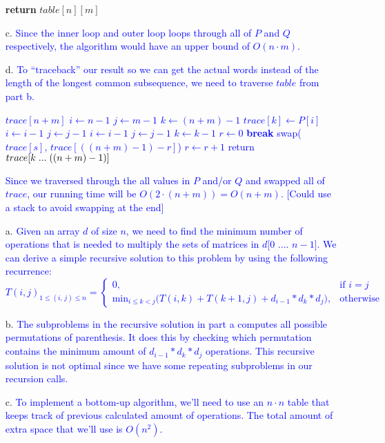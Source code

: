 \documentclass[11pt]{article}
\begin{document}
\begin{itemize}
{\begin{algorithmic}[1]
				\EndIf
			\EndIf
		\EndFor
	\EndFor
	\State \textbf{return} $table[n][m]$
\EndFunction
\end{algorithmic}
}
\item[c.]
\textcolor{blue}{
Since the inner loop and outer loop loops through all of $P$ and $Q$ respectively, the algorithm would have an upper bound of $\boxed{O(n \cdot m)}$.
}
\item[d.]
\textcolor{blue}{
To ``traceback'' our result so we can get the actual words instead of the length of the longest common subsequence, we need to traverse $table$ from part b. 
}
\textcolor{blue}{
\begin{algorithmic}[1]
	\State $trace[n+m]$  
	\State $i \gets n - 1$
	\State $j \gets m - 1$
	\State $k \gets (n+m)-1$
			\State $trace[k] \gets P[i]$
			\State $i \gets i -1$
			\State $j \gets j - 1$
			\State $i \gets i - 1$
		\Else
			\State $j \gets j - 1$
		\EndIf
		\State $k \gets k - 1$
	\EndWhile 
	\State $r \gets 0$
	 
			\State \textbf{break}
		\EndIf
		\State swap($trace[s]$, $trace[((n+m)-1)-r]$)  
		\State $r \gets r + 1$		
	\EndFor
	\State return $trace[k \hspace{1mm} ... \hspace{1mm} ((n+m)-1)]$
\EndFunction
\end{algorithmic}
}

\textcolor{blue}{
Since we traversed through the all values in $P$ and/or $Q$ and swapped all of $trace$, our running time will be $O(2 \cdot (n + m)) = \boxed{O(n + m)}$. [Could use a stack to avoid swapping at the end]
}

\item[a.] 
\textcolor{blue}{
Given an array $d$ of size $n$, we need to find the minimum number of operations that is needed to multiply the sets of matrices in $d[0$ .... $n-1]$. We can derive a simple recursive solution to this problem by using the following recurrence:
$$\boxed{{\displaystyle T(i,j)_{1\leq (i\text{, }j) \leq n}={
\begin{cases}{0},&{\text{if }} i = j\\ \text{min}_{i \leq k < j} \big(T(i, k) + T(k+1, j) + d_{i-1} * d_k * d_j \big),&{\text{otherwise}} 
\end{cases}}}}$$
}
\item[b.]
\textcolor{blue}{
	The subproblems in the recursive solution in part a computes all possible permutations of parenthesis.  It does this by checking which permutation contains the minimum amount of $d_{i-1} * d_k * d_j$ operations. This recursive solution is not optimal since we have some repeating subproblems in our recursion calls.
}
\item[c.]
\textcolor{blue}{
	To implement a bottom-up algorithm, we'll need to use an $n \cdot n$ table that keeps track of previous calculated amount of operations. The total amount of extra space that we'll use is $O(n^2)$.
}


\end{itemize}
\end{document}
